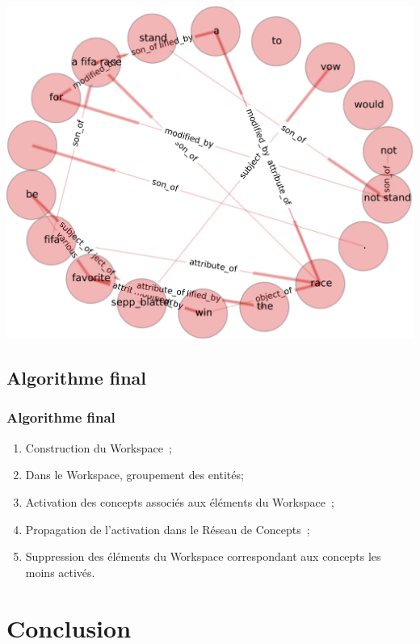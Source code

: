 \documentclass[12pt]{beamer}
\begin{document}
\begin{frame}
  \begin{center}
    \includegraphics[width=\textwidth]{./images/workspace.pdf}
  \end{center}
\end{frame}
\subsection{Algorithme final}

\begin{frame}
 \frametitle{Algorithme final}

 \begin{enumerate}[<+->]
  \item Construction du Workspace~;
  \item Dans le Workspace, groupement des entités;
  \item Activation des concepts associés aux éléments du Workspace~;
  \item Propagation de l'activation dans le Réseau de Concepts~;
  \item Suppression des éléments du Workspace correspondant aux concepts les moins activés.
 \end{enumerate}
 
\end{frame}

\section{Conclusion}
\end{document}
